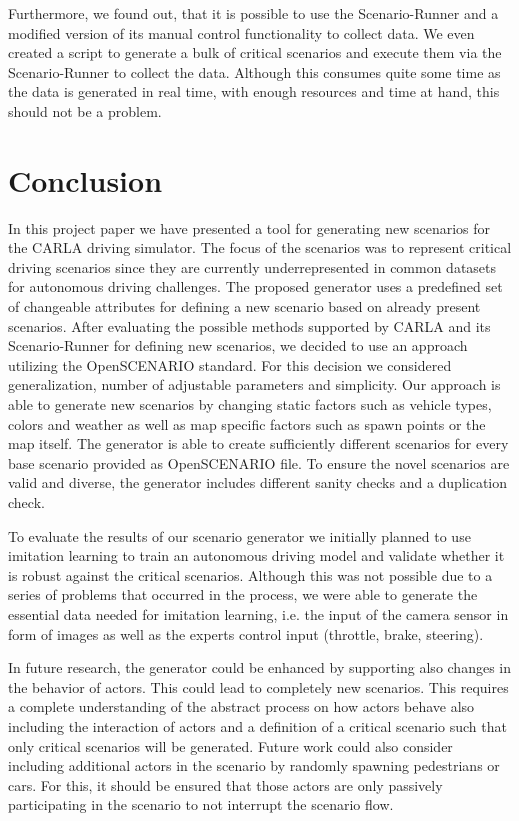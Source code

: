 \documentclass[conference, a4paper, 11pt]{IEEEtran}
\begin{document}
Furthermore, we found out, that it is possible to use the Scenario-Runner and a modified version of its manual control functionality to collect data. We even created a script to generate a bulk of critical scenarios and execute them via the Scenario-Runner to collect the data.
Although this consumes quite some time as the data is generated in real time, with enough resources and time at hand, this should not be a problem.

\section{Conclusion}
In this project paper we have presented a tool for generating new scenarios for the CARLA driving simulator. The focus of the scenarios was to represent critical driving scenarios since they are currently underrepresented in common datasets for autonomous driving challenges.
The proposed generator uses a predefined set of changeable attributes for defining a new scenario based on already present scenarios. After evaluating the possible methods supported by CARLA and its Scenario-Runner for defining new scenarios, we decided to use an approach utilizing the OpenSCENARIO standard. For this decision we considered generalization, number of adjustable parameters and simplicity. Our approach is able to generate new scenarios by changing static factors such as vehicle types, colors and weather as well as map specific factors such as spawn points or the map itself. The generator is able to create sufficiently different scenarios for every base scenario provided as OpenSCENARIO file. To ensure the novel scenarios are valid and diverse, the generator includes different sanity checks and a duplication check.

To evaluate the results of our scenario generator we initially planned to use imitation learning to train an autonomous driving model and validate whether it is robust against the critical scenarios. Although this was not possible due to a series of problems that occurred in the process, we were able to generate the essential data needed for imitation learning, i.e. the input of the camera sensor in form of images as well as the experts control input (throttle, brake, steering).

In future research, the generator could be enhanced by supporting also changes in the behavior of actors. This could lead to completely new scenarios. This requires a complete understanding of the abstract process on how actors behave also including the interaction of actors and a definition of a critical scenario such that only critical scenarios will be generated.
Future work could also consider including additional actors in the scenario by randomly spawning pedestrians or cars. For this, it should be ensured that those actors are only passively participating in the scenario to not interrupt the scenario flow.
\end{document}
